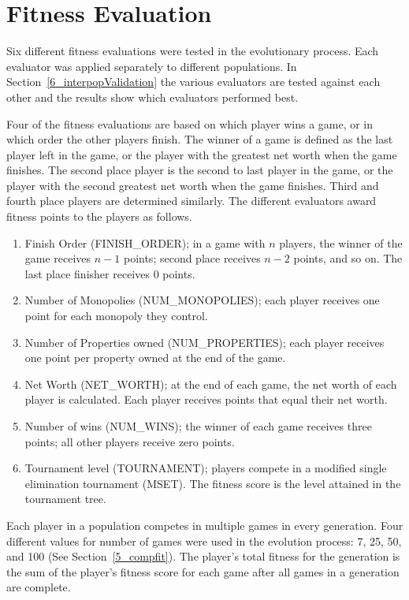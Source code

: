 \section{Fitness Evaluation} \label{5_fitnesseval}

Six different fitness evaluations were tested in the evolutionary process. Each
evaluator was applied separately to different populations. In 
Section~\ref{6_interpopValidation} the various evaluators are tested against 
each other and the results show which evaluators performed best.

Four of the fitness evaluations are based on which player wins a game, or in
which order the other players finish. The winner of a game is defined as the
last player left in the game, or the player with the greatest net worth when the
game finishes. The second place player is the second to last player in the game,
or the player with the second greatest net worth when the game finishes. Third
and fourth place players are determined similarly. The different evaluators
award fitness points to the players as follows.

\begin{enumerate}
  \item {Finish Order (FINISH\_ORDER); in a game with \(n\) players, the winner
  of the game receives \(n-1\) points; second place receives \(n-2\) points, and
  so on. The last place finisher receives 0 points.}
  \item {Number of Monopolies (NUM\_MONOPOLIES); each player receives one
  point for each monopoly they control.}
  \item {Number of Properties owned (NUM\_PROPERTIES); each player receives one
  point per property owned at the end of the game.}
  \item {Net Worth (NET\_WORTH); at the end of each game, the net worth of each
  player is calculated. Each player receives points that equal their net
  worth.}
  \item {Number of wins (NUM\_WINS); the winner of each game receives three
  points; all other players receive zero points.}
  \item {Tournament level (TOURNAMENT); players compete in a modified single
  elimination tournament (MSET). The fitness score is the level attained in the
  tournament tree.}
\end{enumerate}

Each player in a population competes in multiple games in every generation. Four
different values for number of games were used in the evolution process: 7, 25,
50, and 100 (See Section~\ref{5_compfit}). The player's total fitness for the
generation is the sum of the player's fitness score for each game after all
games in a generation are complete.

